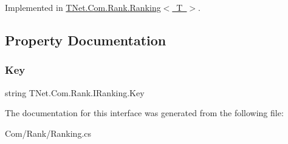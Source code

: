 Implemented in \mbox{\hyperlink{class_t_net_1_1_com_1_1_rank_1_1_ranking_a4458c9bb281a9a2401580aca4e7cf28b}{T\+Net.\+Com.\+Rank.\+Ranking$<$ T $>$}}.



\subsection{Property Documentation}
\mbox{\label{interface_t_net_1_1_com_1_1_rank_1_1_i_ranking_ad63f39092f304f103b07ad7194b58c91}} 
\subsubsection{\texorpdfstring{Key}{Key}}
{\footnotesize\ttfamily string T\+Net.\+Com.\+Rank.\+I\+Ranking.\+Key\hspace{0.3cm}{\ttfamily [get]}}







The documentation for this interface was generated from the following file\+:\begin{DoxyCompactItemize}
\item 
Com/\+Rank/Ranking.\+cs\end{DoxyCompactItemize}
